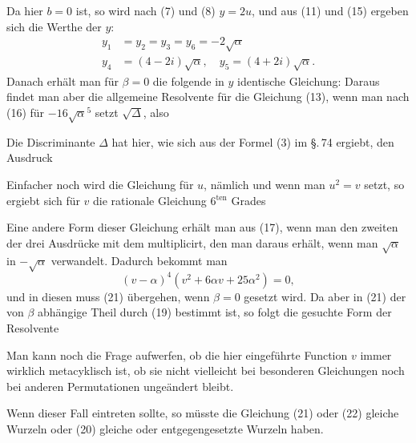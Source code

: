 
Da hier $b=0$ ist, so wird nach (7) und (8) $y=2u$, und
aus (11) und (15) ergeben sich die Werthe der $y$:
\[
\begin{aligned}
y_1&=y_2=y_3=y_6=-2\sqrt{\alpha}\\
y_4&=(4-2i)\sqrt{\alpha},\quad y_5=(4+2i)\sqrt{\alpha}.
\end{aligned}
\]
Danach erh\"alt man f\"ur $\beta=0$ die folgende in $y$ identische
Gleichung:
Daraus findet man aber die allgemeine Resolvente f\"ur die
Gleichung (13), wenn man nach (16) f\"ur $-16\sqrt{\alpha}^5$ setzt $\sqrt{\Delta}$, also

Die Discriminante $\Delta$ hat hier, wie sich aus der Formel (3)
im \S.\,74 ergiebt, den Ausdruck

Einfacher noch wird die Gleichung f\"ur $u$, n\"amlich
und wenn man $u^2=v$ setzt, so ergiebt sich f\"ur $v$ die rationale
Gleichung 6$^{\text{ten}}$ Grades

Eine andere Form dieser Gleichung erh\"alt man aus (17),
wenn man den zweiten der drei Ausdr\"ucke mit dem multiplicirt,
den man daraus erh\"alt, wenn man $\sqrt{\alpha}$ in $-\sqrt{\alpha}$ verwandelt.
Dadurch bekommt man
\[
(v-\alpha)^4(v^2+6\alpha v+25\alpha^2)=0,
\]
und in diesen muss (21) \"ubergehen, wenn $\beta=0$ gesetzt wird.
Da aber in (21) der von $\beta$ abh\"angige Theil durch (19) bestimmt
ist, so folgt die gesuchte Form der Resolvente

Man kann noch die Frage aufwerfen, ob die hier eingef\"uhrte
Function $v$ immer wirklich metacyklisch ist, ob sie nicht vielleicht
 bei besonderen Gleichungen noch bei anderen Permutationen
 unge\"andert bleibt.

Wenn dieser Fall eintreten sollte, so m\"usste die Gleichung
(21) oder (22) gleiche Wurzeln oder (20) gleiche oder entgegengesetzte
 Wurzeln haben.
